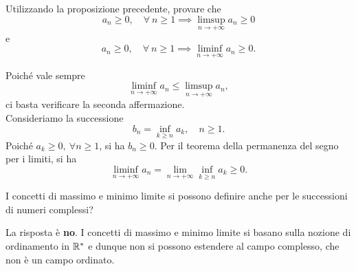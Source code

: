 \begin{exercisewt}\label{limsuppermanenzadelsegno}
Utilizzando la proposizione precedente, provare che
\begin{equation*}
	a_n \geq 0,\quad \forall \ n\geq 1 \implies \limsup_{n\to +\infty} a_n\geq 0
\end{equation*}
e
\begin{equation*}
	a_n \geq 0,\quad \forall \ n\geq 1 \implies \liminf_{n\to +\infty} a_n \geq 0.
\end{equation*} 
\end{exercisewt}
\begin{solution} Poiché vale sempre
\begin{equation*}
	\liminf_{n\to +\infty} a_n \leq \limsup_{n\to +\infty} a_n,
\end{equation*}
ci basta verificare la seconda affermazione.\\
Consideriamo la successione
\begin{equation*}
	b_n=\inf_{k\geq n} a_k,\quad n\geq 1.
\end{equation*}	
Poiché $a_k\geq 0,\ \forall n\geq 1$, si ha $b_n\geq 0$. Per il teorema della permanenza del segno per i limiti, si ha
\begin{equation*}
	\liminf_{n\to +\infty} a_n=\lim_{n\to+\infty}\inf_{k\geq n} a_k\geq 0.
\end{equation*}
\end{solution}
\begin{exercise}
I concetti di massimo e minimo limite si possono definire anche per le successioni di numeri complessi?
\end{exercise}
\begin{solution}
La risposta è \textbf{no}.  I concetti di massimo e minimo limite si basano sulla nozione di ordinamento in $\mathbb{R}^{\ast}$ e dunque non si possono estendere al campo complesso, che non è un campo ordinato.
\end{solution}
